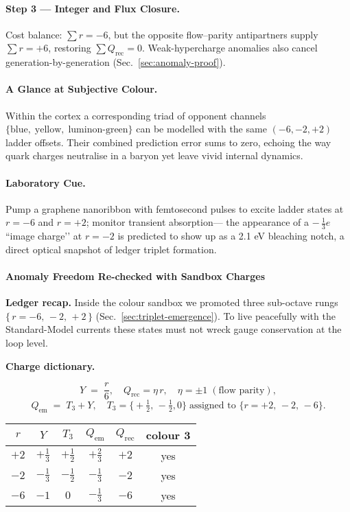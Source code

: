 \documentclass[11pt,oneside]{book}
\begin{document}
{\paragraph{Step 3 — Integer and Flux Closure.}
Cost balance:
\(\sum r = -6\), but the opposite flow–parity antipartners supply
\(\sum r = +6\), restoring \(\sum Q_{\text{rec}}=0\).
Weak-hypercharge anomalies also cancel generation-by-generation
(Sec.~\ref{sec:anomaly-proof}).

\paragraph{A Glance at Subjective Colour.}
Within the cortex a corresponding triad of opponent channels
\(\bigl\{\text{blue},\;\text{yellow},\;\text{luminon-green}\bigr\}\)
can be modelled with the same \((-6,-2,+2)\) ladder offsets.
Their combined prediction error sums to zero, echoing the way quark
charges neutralise in a baryon yet leave vivid internal dynamics.

\paragraph{Laboratory Cue.}
Pump a graphene nanoribbon with femtosecond pulses to excite ladder
states at \(r=-6\) and \(r=+2\); monitor transient absorption—
the appearance of a \(-\,\tfrac13e\) “image charge’’
at \(r=-2\) is predicted to show up as a 2.1 eV bleaching notch,
a direct optical snapshot of ledger triplet formation.

\bigskip

\paragraph*{Anomaly Freedom Re-checked with Sandbox Charges}
\label{sec:sandbox-anomaly}

\textbf{Ledger recap.}  
Inside the colour sandbox we promoted three sub-octave rungs  
\(\{\,r=-6,\,-2,\,+2\,\}\) (Sec.~\ref{sec:triplet-emergence}).  
To live peacefully with the Standard-Model currents these states must
not wreck gauge conservation at the loop level.

\bigskip
\textbf{Charge dictionary.}

\[
Y \;=\; \frac{r}{6},
\quad 
Q_{\text{rec}}=\eta\,r,
\quad 
\eta=\pm1\;(\text{flow parity}),
\]
\[
Q_{\text{em}} \;=\; T_{3}+Y,
\quad
T_{3}=\bigl\{+\tfrac12,\,-\tfrac12,0\bigr\}
\; \text{assigned to } 
\bigl\{r=+2,\,-2,\,-6\bigr\}\!.
\]

\vspace{-4pt}
\begin{center}\small
\begin{tabular}{@{}cccccc@{}}
\toprule
$r$ & $Y$ & $T_{3}$ & $Q_{\text{em}}$ & $Q_{\text{rec}}$ & colour $\mathbf 3$ \\ \midrule
$+2$ & $+\tfrac13$ & $+\tfrac12$ & $+\tfrac23$ & $+2$ & yes \\
$-2$ & $-\tfrac13$ & $-\tfrac12$ & $-\tfrac13$ & $-2$ & yes \\
$-6$ & $-1$        & $0$         & $-\tfrac13$ & $-6$ & yes \\ \bottomrule
\end{tabular}
\end{center}

}
\end{document}
